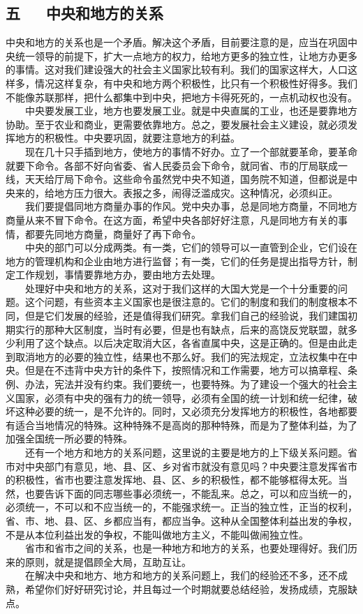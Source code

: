 \documentclass[cn,11pt,chinese]{elegantbook}
\def\myformat#1{\hfil\hfil #1}
\begin{document}
\subsection*{\myformat{五 　  中央和地方的关系}}
中央和地方的关系也是一个矛盾。解决这个矛盾，目前要注意的是，应当在巩固中央统一领导的前提下，扩大一点地方的权力，给地方更多的独立性，让地方办更多的事情。这对我们建设强大的社会主义国家比较有利。我们的国家这样大，人口这样多，情况这样复杂，有中央和地方两个积极性，比只有一个积极性好得多。我们不能像苏联那样，把什么都集中到中央，把地方卡得死死的，一点机动权也没有。\\
　　中央要发展工业，地方也要发展工业。就是中央直属的工业，也还是要靠地方协助。至于农业和商业，更需要依靠地方。总之，要发展社会主义建设，就必须发挥地方的积极性。中央要巩固，就要注意地方的利益。\\
　　现在几十只手插到地方，使地方的事情不好办。立了一个部就要革命，要革命就要下命令。各部不好向省委、省人民委员会下命令，就同省、市的厅局联成一线，天天给厅局下命令。这些命令虽然党中央不知道，国务院不知道，但都说是中央来的，给地方压力很大。表报之多，闹得泛滥成灾。这种情况，必须纠正。\\
　　我们要提倡同地方商量办事的作风。党中央办事，总是同地方商量，不同地方商量从来不冒下命令。在这方面，希望中央各部好好注意，凡是同地方有关的事情，都要先同地方商量，商量好了再下命令。\\
　　中央的部门可以分成两类。有一类，它们的领导可以一直管到企业，它们设在地方的管理机构和企业由地方进行监督；有一类，它们的任务是提出指导方针，制定工作规划，事情要靠地方办，要由地方去处理。\\
　　处理好中央和地方的关系，这对于我们这样的大国大党是一个十分重要的问题。这个问题，有些资本主义国家也是很注意的。它们的制度和我们的制度根本不同，但是它们发展的经验，还是值得我们研究。拿我们自己的经验说，我们建国初期实行的那种大区制度，当时有必要，但是也有缺点，后来的高饶反党联盟，就多少利用了这个缺点。以后决定取消大区，各省直属中央，这是正确的。但是由此走到取消地方的必要的独立性，结果也不那么好。我们的宪法规定，立法权集中在中央。但是在不违背中央方针的条件下，按照情况和工作需要，地方可以搞章程、条例、办法，宪法并没有约束。我们要统一，也要特殊。为了建设一个强大的社会主义国家，必须有中央的强有力的统一领导，必须有全国的统一计划和统一纪律，破坏这种必要的统一，是不允许的。同时，又必须充分发挥地方的积极性，各地都要有适合当地情况的特殊。这种特殊不是高岗的那种特殊，而是为了整体利益，为了加强全国统一所必要的特殊。\\
　　还有一个地方和地方的关系问题，这里说的主要是地方的上下级关系问题。省市对中央部门有意见，地、县、区、乡对省市就没有意见吗？中央要注意发挥省市的积极性，省市也要注意发挥地、县、区、乡的积极性，都不能够框得太死。当然，也要告诉下面的同志哪些事必须统一，不能乱来。总之，可以和应当统一的，必须统一，不可以和不应当统一的，不能强求统一。正当的独立性，正当的权利，省、市、地、县、区、乡都应当有，都应当争。这种从全国整体利益出发的争权，不是从本位利益出发的争权，不能叫做地方主义，不能叫做闹独立性。\\
　　省市和省市之间的关系，也是一种地方和地方的关系，也要处理得好。我们历来的原则，就是提倡顾全大局，互助互让。\\
　　在解决中央和地方、地方和地方的关系问题上，我们的经验还不多，还不成熟，希望你们好好研究讨论，并且每过一个时期就要总结经验，发扬成绩，克服缺点。\\
\end{document}
